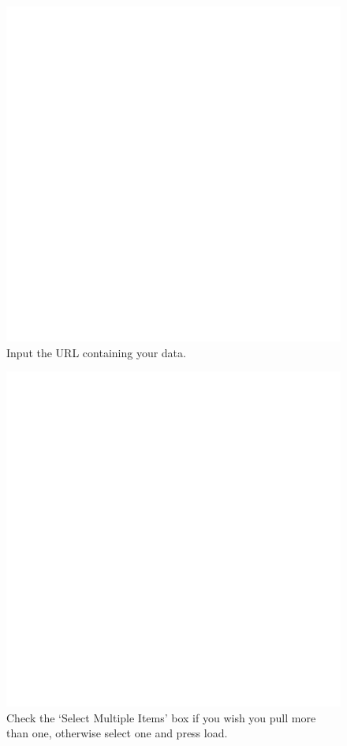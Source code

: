 \documentclass[
  11,
]{book}
\begin{document}
\begin{figure}
\centering
\includegraphics{_book/_main_files/images/url_input.png}
\caption{\label{fig:image2}Input the URL containing your data.}
\end{figure}

\begin{figure}
\centering
\includegraphics{_book/_main_files/images/Excel_Query_Multi.png}
\caption{\label{fig:image3}Check the `Select Multiple Items' box if you wish you pull more than one, otherwise select one and press load.}
\end{figure}
\end{document}
